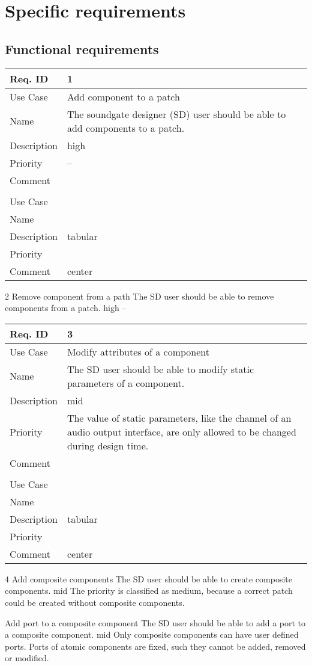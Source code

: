 \chapter{Specific requirements}

\newcommand{\funcRequirement}[6]{
\begin{center}
\begin{tabular}{|l|p{12cm}|}
\hline
Req. ID 		& #1 \\ \hline
Use Case 		& #2 \\ \hline
Name 				& #3 \\ \hline
Description & #4 \\ \hline
Priority 		& #5 \\ \hline
Comment 		& #6 \\ \hline
\end{tabular}
\end{center}
}


	\section{Functional requirements}
	

	\funcRequirement{1}
	{Add component to a patch}
	{The soundgate designer (SD) user should be able to add components to a patch.}
	{high}
	{--}
	
  \funcRequirement{2}
	{Remove component from a path}
	{The SD user should be able to remove components from a patch.}
	{high}
	{--}
	
  \funcRequirement{3}
	{Modify attributes of a component}
	{The SD user should be able to modify static parameters of a component.}
	{mid}
	{The value of static parameters, like the channel of an audio output interface, are only allowed to be changed during design time.}
	
	\funcRequirement{4}
	{Add composite components}
	{The SD user should be able to create composite components.}
	{mid}
	{The priority is classified as medium, because a correct patch could be created without composite components. }
	
	{Add port to a composite component}
	{The SD user should be able to add a port to a composite component.}
	{mid}
	{Only composite components can have user defined ports. Ports of atomic components are fixed, such they cannot be added, removed or modified.}
	
